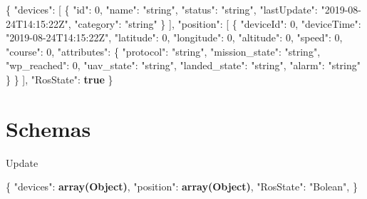 \documentclass[
]{article}
\newenvironment{Shaded}{}{}
\newcommand{\DataTypeTok}[1]{\textcolor[rgb]{0.56,0.13,0.00}{#1}}
\newcommand{\DecValTok}[1]{\textcolor[rgb]{0.25,0.63,0.44}{#1}}
\newcommand{\ErrorTok}[1]{\textcolor[rgb]{1.00,0.00,0.00}{\textbf{#1}}}
\newcommand{\FunctionTok}[1]{\textcolor[rgb]{0.02,0.16,0.49}{#1}}
\newcommand{\KeywordTok}[1]{\textcolor[rgb]{0.00,0.44,0.13}{\textbf{#1}}}
\newcommand{\OtherTok}[1]{\textcolor[rgb]{0.00,0.44,0.13}{#1}}
\newcommand{\StringTok}[1]{\textcolor[rgb]{0.25,0.44,0.63}{#1}}
\begin{document}
\begin{Shaded}
\begin{Highlighting}[]
\FunctionTok{\{}
  \DataTypeTok{"devices"}\FunctionTok{:} \OtherTok{[}
    \FunctionTok{\{}
      \DataTypeTok{"id"}\FunctionTok{:} \DecValTok{0}\FunctionTok{,}
      \DataTypeTok{"name"}\FunctionTok{:} \StringTok{"string"}\FunctionTok{,}
      \DataTypeTok{"status"}\FunctionTok{:} \StringTok{"string"}\FunctionTok{,}
      \DataTypeTok{"lastUpdate"}\FunctionTok{:} \StringTok{"2019{-}08{-}24T14:15:22Z"}\FunctionTok{,}
      \DataTypeTok{"category"}\FunctionTok{:} \StringTok{"string"}
    \FunctionTok{\}}
  \OtherTok{]}\FunctionTok{,}
  \DataTypeTok{"position"}\FunctionTok{:} \OtherTok{[}
    \FunctionTok{\{}
      \DataTypeTok{"deviceId"}\FunctionTok{:} \DecValTok{0}\FunctionTok{,}
      \DataTypeTok{"deviceTime"}\FunctionTok{:} \StringTok{"2019{-}08{-}24T14:15:22Z"}\FunctionTok{,}
      \DataTypeTok{"latitude"}\FunctionTok{:} \DecValTok{0}\FunctionTok{,}
      \DataTypeTok{"longitude"}\FunctionTok{:} \DecValTok{0}\FunctionTok{,}
      \DataTypeTok{"altitude"}\FunctionTok{:} \DecValTok{0}\FunctionTok{,}
      \DataTypeTok{"speed"}\FunctionTok{:} \DecValTok{0}\FunctionTok{,}
      \DataTypeTok{"course"}\FunctionTok{:} \DecValTok{0}\FunctionTok{,}
      \DataTypeTok{"attributes"}\FunctionTok{:} \FunctionTok{\{}
        \DataTypeTok{"protocol"}\FunctionTok{:} \StringTok{"string"}\FunctionTok{,}
        \DataTypeTok{"mission\_state"}\FunctionTok{:} \StringTok{"string"}\FunctionTok{,}
        \DataTypeTok{"wp\_reached"}\FunctionTok{:} \DecValTok{0}\FunctionTok{,}
        \DataTypeTok{"uav\_state"}\FunctionTok{:} \StringTok{"string"}\FunctionTok{,}
        \DataTypeTok{"landed\_state"}\FunctionTok{:} \StringTok{"string"}\FunctionTok{,}
        \DataTypeTok{"alarm"}\FunctionTok{:} \StringTok{"string"}
      \FunctionTok{\}}
    \FunctionTok{\}}
  \OtherTok{]}\FunctionTok{,}
  \DataTypeTok{"RosState"}\FunctionTok{:} \KeywordTok{true}
\FunctionTok{\}}
\end{Highlighting}
\end{Shaded}

\hypertarget{schemas}{%
\section{Schemas}\label{schemas}}

Update

\begin{Shaded}
\begin{Highlighting}[]
\FunctionTok{\{}
  \DataTypeTok{"devices"}\FunctionTok{:} \ErrorTok{array(Object)}\FunctionTok{,}
  \DataTypeTok{"position"}\FunctionTok{:} \ErrorTok{array(Object)}\FunctionTok{,}
  \DataTypeTok{"RosState"}\FunctionTok{:} \StringTok{"Bolean"}\FunctionTok{,}
\FunctionTok{\}}
\end{Highlighting}
\end{Shaded}
\end{document}

